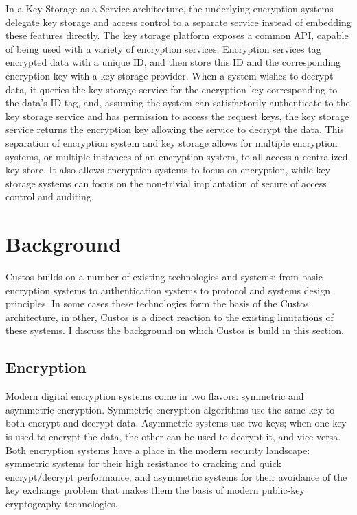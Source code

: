 In a Key Storage as a Service architecture, the underlying encryption
systems delegate key storage and access control to a separate service
instead of embedding these features directly. The key storage platform
exposes a common API, capable of being used with a variety of
encryption services. Encryption services tag encrypted data with a
unique ID, and then store this ID and the corresponding encryption key
with a key storage provider. When a system wishes to decrypt data, it
queries the key storage service for the encryption key corresponding
to the data's ID tag, and, assuming the system can satisfactorily
authenticate to the key storage service and has permission to access
the request keys, the key storage service returns the encryption key
allowing the service to decrypt the data. This separation of
encryption system and key storage allows for multiple encryption
systems, or multiple instances of an encryption system, to all access
a centralized key store. It also allows encryption systems to focus on
encryption, while key storage systems can focus on the non-trivial
implantation of secure of access control and auditing.

\section{Background}

Custos builds on a number of existing technologies and systems: from
basic encryption systems to authentication systems to protocol and
systems design principles. In some cases these technologies form the
basis of the Custos architecture, in other, Custos is a direct
reaction to the existing limitations of these systems. I discuss the
background on which Custos is build in this section.

\subsection{Encryption}

Modern digital encryption systems come in two flavors: symmetric and
asymmetric encryption. Symmetric encryption algorithms use the same
key to both encrypt and decrypt data. Asymmetric systems use two keys;
when one key is used to encrypt the data, the other can be used to
decrypt it, and vice versa. Both encryption systems have a place in
the modern security landscape: symmetric systems for their high
resistance to cracking and quick encrypt/decrypt performance, and
asymmetric systems for their avoidance of the key exchange problem
that makes them the basis of modern public-key cryptography
technologies.

